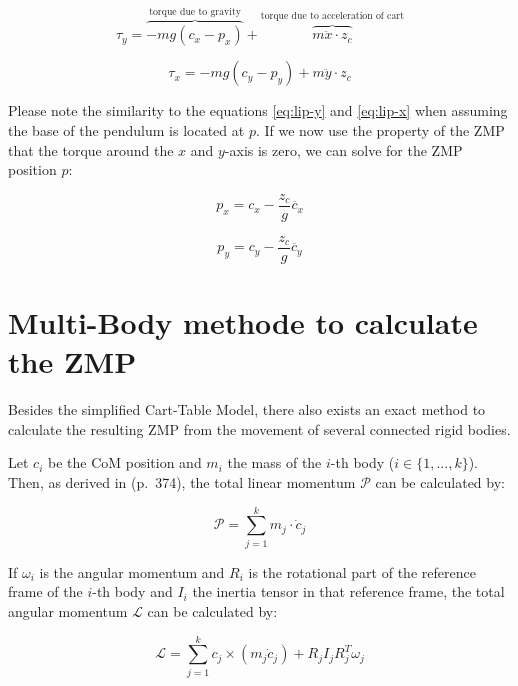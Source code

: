 \documentclass[english,ngerman]{KITreprt}
\begin{document}
\begin{equation}
\tau_y = \overbrace{-m g (c_x - p_x)}^{\text{torque due to gravity}} + \overbrace{m \ddot{x} \cdot z_c}^{\text{torque due to acceleration of cart}}
\end{equation}

\begin{equation}
\tau_x = -m g (c_y - p_y) + m \ddot{y} \cdot z_c
\end{equation}

Please note the similarity to the equations \ref{eq:lip-y} and
\ref{eq:lip-x} when assuming the base of the pendulum is located at $p$.
If we now use the property of the ZMP that the torque around the $x$ and
$y$-axis is zero, we can solve for the ZMP position $p$:

\begin{equation} \label{eq:zmp-x}
p_x = c_x - \frac{z_c}{g} \ddot{c_x}
\end{equation}

\begin{equation} \label{eq:zmp-y}
p_y = c_y - \frac{z_c}{g} \ddot{c_y}
\end{equation}

\section{Multi-Body methode to calculate the
ZMP}\label{section:multi-body-zmp}

Besides the simplified Cart-Table Model, there also exists an exact
method to calculate the resulting ZMP from the movement of several
connected rigid bodies.

Let $c_i$ be the CoM position and $m_i$ the mass of the $i$-th body
($i \in \{1, ..., k\}$). Then, as derived in
\cite{siciliano2008springer} (p.~374), the total linear momentum
$\mathcal{P}$ can be calculated by:

\begin{equation}
\mathcal{P} = \sum^k_{j=1} m_j \cdot \dot{c}_j
\end{equation}

If $\omega_i$ is the angular momentum and $R_i$ is the rotational part
of the reference frame of the $i$-th body and $I_i$ the inertia tensor
in that reference frame, the total angular momentum $\mathcal{L}$ can be
calculated by:

\begin{equation}
\mathcal{L} = \sum^k_{j=1} c_j \times (m_j \dot{c}_j) + R_j I_j R^T_j \omega_j
\end{equation}
\end{document}
